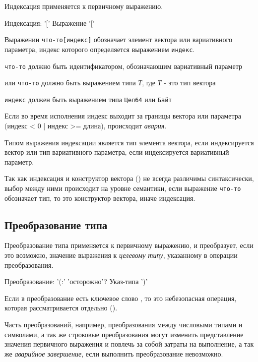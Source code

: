 Индексация применяется к первичному выражению.

\begin{Grammar}
Индексация: '[' Выражение '['
\end{Grammar}    

Выражении \verb|что-то[индекс]| обозначает элемент вектора или вариативного параметра, индекс которого определяется выражением \verb|индекс|.
\begin{d_itemize}
\item
    \verb|что-то| должно быть идентификатором, обозначающим вариативный параметр
\item
    или \verb|что-то| должно быть выражением типа \emph{Т}, где \emph{Т} - это тип вектора
\item
    \verb|индекс| должен быть выражением типа \verb|Цел64| или \verb|Байт|
\end{d_itemize}

Если во время исполнения индекс выходит за границы вектора или параметра (индекс < 0 | индекс >= длина), происходит \emph{авария}.

Типом выражения индексации является тип элемента вектора, если индексируется вектор или тип вариативного параметра, если индексируется вариативный параметр.

Так как индексация и конструктор вектора () не всегда различимы синтаксически, выбор между ними происходит на уровне семантики, 
если выражение \verb|что-то|  обозначает тип, то это конструктор вектора, иначе индексация.

\hypertarget{conversion}{%
\subsection{Преобразование типа}\label{expr:conversion}}

Преобразование типа применяется к первичному выражению, и преобразует, если это возможно, значение выражения к \emph{целевому типу}, указанному в операции преобразования.

\begin{Grammar}
Преобразование: '(:' 'осторожно'? Указ-типа ')'
\end{Grammar}   

Если в преобразование есть ключевое слово , то это небезопасная операция, которая рассматривается отдельно ().

Часть преобразований, например, преобразования между числовыми типами и символами, а так же строковые преобразования могут изменить 
представление значения первичного выражения и повлечь за собой затраты на выполнение, а так же \emph{аварийное завершение}, если выполнить преобразование невозможно.

